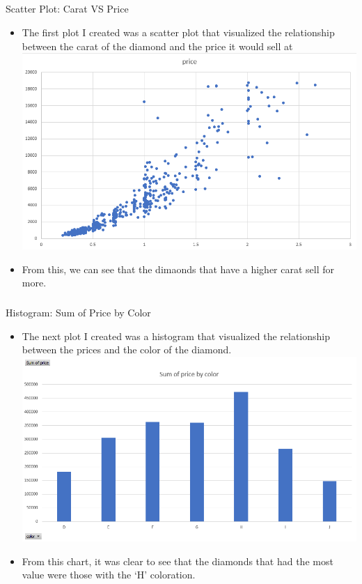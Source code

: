 \documentclass[
  letterpaper,
  DIV=11,
  numbers=noendperiod]{scrreprt}
\makeatletter
\let\oldsubparagraph\subparagraph
\renewcommand{\subparagraph}{
    \@ifstar
      \xxxSubParagraphStar
      \xxxSubParagraphNoStar
  }
\newcommand{\xxxSubParagraphStar}[1]{\oldsubparagraph*{#1}\mbox{}}
\newcommand{\xxxSubParagraphNoStar}[1]{\oldsubparagraph{#1}\mbox{}}
\providecommand{\tightlist}{%
  \setlength{\itemsep}{0pt}\setlength{\parskip}{0pt}}\usepackage{longtable,booktabs,array}
\makeatother
\begin{document}
\subparagraph{Scatter Plot: Carat VS
Price}\label{scatter-plot-carat-vs-price}

\begin{itemize}
\tightlist
\item
  The first plot I created was a scatter plot that visualized the
  relationship between the carat of the diamond and the price it would
  sell at
  \includegraphics{./Excel_1_Unit/Week1_Chris/scatter_carat_vs_price.png}
\item
  From this, we can see that the dimaonds that have a higher carat sell
  for more.
\end{itemize}

\subparagraph{Histogram: Sum of Price by
Color}\label{histogram-sum-of-price-by-color}

\begin{itemize}
\item
  The next plot I created was a histogram that visualized the
  relationship between the prices and the color of the diamond.
  \includegraphics{./Excel_1_Unit/Week1_Chris/histogram_price_color.png}
\item
  From this chart, it was clear to see that the diamonds that had the
  most value were those with the `H' coloration.
\end{itemize}
\end{document}
